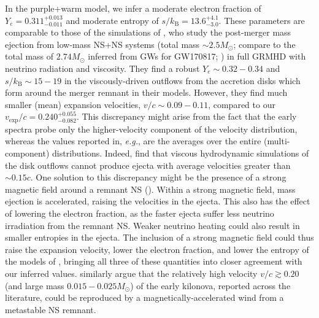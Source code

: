 \documentclass[twocolumn, twocolappendix]{aastex63}
\def\eg{{\it e.g.}}
\begin{document}
In the purple+warm model, we infer a moderate electron fraction of $Y_e = 0.311^{+0.013}_{-0.011}$ and moderate entropy of $s/k_{\mathrm{B}} = 13.6^{+4.1}_{-3.0}$. These parameters are comparable to those of the simulations of \cite{fujibayashi20}, who study the post-merger mass ejection from low-mass NS+NS systems (total mass $\sim 2.5 M_{\odot}$; compare to the total mass of $2.74 M_{\odot}$ inferred from GWs for GW170817; \citealt{abbott17c}) in full GRMHD with neutrino radiation and viscosity. They find a robust $Y_e \sim 0.32 - 0.34$ and $s/k_{\mathrm{B}} \sim 15-19$ in the viscously-driven outflows from the accretion disks which form around the merger remnant in their models. However, they find much smaller (mean) expansion velocities, $v/c \sim 0.09-0.11$, compared to our $v_{\mathrm{exp}}/c = 0.240^{+0.055}_{-0.082}$. This discrepancy might arise from the fact that the early spectra probe only the higher-velocity component of the velocity distribution, whereas the values reported in, \eg, \cite{fujibayashi20} are the averages over the entire (multi-component) distributions. Indeed, \cite{fahlman18} find that viscous hydrodynamic simulations of the disk outflows cannot produce ejecta with average velocities greater than $\sim 0.15c$. One solution to this discrepancy might be the presence of a strong magnetic field around a remnant NS (\citealt{metzger18, fujibayashi20}). Within a strong magnetic field, mass ejection is accelerated, raising the velocities in the ejecta. This also has the effect of lowering the electron fraction, as the faster ejecta suffer less neutrino irradiation from the remnant NS. Weaker neutrino heating could also result in smaller entropies in the ejecta. The inclusion of a strong magnetic field could thus raise the expansion velocity, lower the electron fraction, and lower the entropy of the models of \cite{fujibayashi20}, bringing all three of these quantities into closer agreement with our inferred values. \cite{ciolfi20a, ciolfi20b} similarly argue that the relatively high velocity $v/c \gtrsim 0.20$ (and large mass $0.015 - 0.025 M_{\odot}$) of the early kilonova, reported across the literature, could be reproduced by a magnetically-accelerated wind from a metastable NS remnant. 
\end{document}
